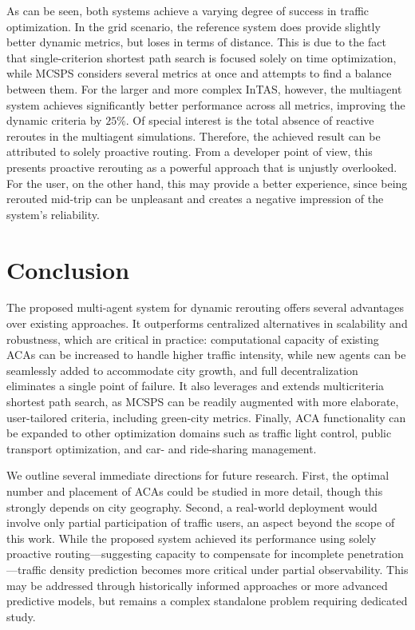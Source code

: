 \documentclass[sigconf]{aamas}
\begin{document}
As can be seen, both systems achieve a varying degree of success in traffic optimization. In the grid scenario, the reference system does provide slightly better dynamic metrics, but loses in terms of distance. This is due to the fact that single-criterion shortest path search is focused solely on time optimization, while MCSPS considers several metrics at once and attempts to find a balance between them. For the larger and more complex InTAS, however, the multiagent system achieves significantly better performance across all metrics, improving the dynamic criteria by $25\%$. Of special interest is the total absence of reactive reroutes in the multiagent simulations. Therefore, the achieved result can be attributed to solely proactive routing. From a developer point of view, this presents proactive rerouting as a powerful approach that is unjustly overlooked. For the user, on the other hand, this may provide a better experience, since being rerouted mid-trip can be unpleasant and creates a negative impression of the system's reliability.

\section{Conclusion}
The proposed multi-agent system for dynamic rerouting offers several advantages over existing approaches. It outperforms centralized alternatives in scalability and robustness, which are critical in practice: computational capacity of existing ACAs can be increased to handle higher traffic intensity, while new agents can be seamlessly added to accommodate city growth, and full decentralization eliminates a single point of failure. It also leverages and extends multicriteria shortest path search, as MCSPS can be readily augmented with more elaborate, user-tailored criteria, including green-city metrics. Finally, ACA functionality can be expanded to other optimization domains such as traffic light control, public transport optimization, and car- and ride-sharing management.

We outline several immediate directions for future research. First, the optimal number and placement of ACAs could be studied in more detail, though this strongly depends on city geography. Second, a real-world deployment would involve only partial participation of traffic users, an aspect beyond the scope of this work. While the proposed system achieved its performance using solely proactive routing—suggesting capacity to compensate for incomplete penetration—traffic density prediction becomes more critical under partial observability. This may be addressed through historically informed approaches or more advanced predictive models, but remains a complex standalone problem requiring dedicated study.
\end{document}
